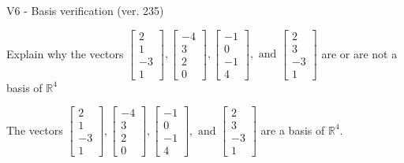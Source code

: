 \begin{exercise}
  \begin{exerciseTitle}V6 - Basis verification (ver. 235)\end{exerciseTitle}
  \begin{exerciseStatement}
    Explain why the vectors \(\left[\begin{array}{r}
2 \\
1 \\
-3 \\
1
\end{array}\right] , \left[\begin{array}{r}
-4 \\
3 \\
2 \\
0
\end{array}\right] , \left[\begin{array}{r}
-1 \\
0 \\
-1 \\
4
\end{array}\right] , \text{ and } \left[\begin{array}{r}
2 \\
3 \\
-3 \\
1
\end{array}\right]\) are or are not a basis of \(\mathbb{R}^4\)	


  \end{exerciseStatement}
  \begin{exerciseAnswer}
   The vectors \(\left[\begin{array}{r}
2 \\
1 \\
-3 \\
1
\end{array}\right] , \left[\begin{array}{r}
-4 \\
3 \\
2 \\
0
\end{array}\right] , \left[\begin{array}{r}
-1 \\
0 \\
-1 \\
4
\end{array}\right] , \text{ and } \left[\begin{array}{r}
2 \\
3 \\
-3 \\
1
\end{array}\right]\) 
  	 are  a basis of \(\mathbb{R}^4\).
  


  \end{exerciseAnswer}
\end{exercise}